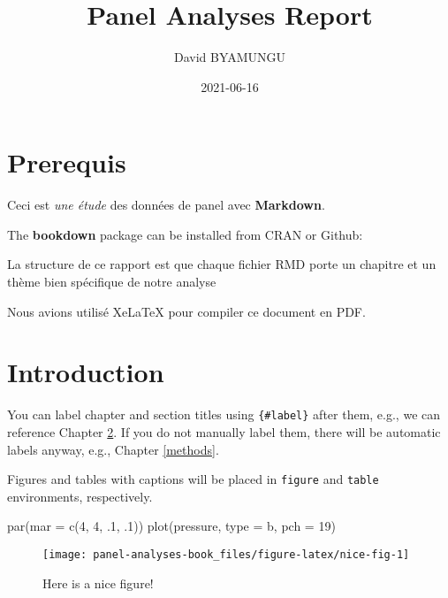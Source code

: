 \documentclass[
]{book}
\title{Panel Analyses Report}
\author{David BYAMUNGU}
\date{2021-06-16}
\newenvironment{Shaded}{\begin{snugshade}}{\end{snugshade}}
\newcommand{\AttributeTok}[1]{\textcolor[rgb]{0.77,0.63,0.00}{#1}}
\newcommand{\DecValTok}[1]{\textcolor[rgb]{0.00,0.00,0.81}{#1}}
\newcommand{\FunctionTok}[1]{\textcolor[rgb]{0.00,0.00,0.00}{#1}}
\newcommand{\NormalTok}[1]{#1}
\newcommand{\StringTok}[1]{\textcolor[rgb]{0.31,0.60,0.02}{#1}}
\begin{document}
\maketitle

{
\setcounter{tocdepth}{1}
\tableofcontents
}
\hypertarget{prerequis}{%
\chapter{Prerequis}\label{prerequis}}

Ceci est \emph{une étude} des données de panel avec \textbf{Markdown}.

The \textbf{bookdown} package can be installed from CRAN or Github:

La structure de ce rapport est que chaque fichier RMD porte un chapitre et un thème bien spécifique de notre analyse

Nous avions utilisé XeLaTeX pour compiler ce document en PDF.

\hypertarget{intro}{%
\chapter{Introduction}\label{intro}}

You can label chapter and section titles using \texttt{\{\#label\}} after them, e.g., we can reference Chapter \ref{intro}. If you do not manually label them, there will be automatic labels anyway, e.g., Chapter \ref{methods}.

Figures and tables with captions will be placed in \texttt{figure} and \texttt{table} environments, respectively.

\begin{Shaded}
\begin{Highlighting}[]
\FunctionTok{par}\NormalTok{(}\AttributeTok{mar =} \FunctionTok{c}\NormalTok{(}\DecValTok{4}\NormalTok{, }\DecValTok{4}\NormalTok{, .}\DecValTok{1}\NormalTok{, .}\DecValTok{1}\NormalTok{))}
\FunctionTok{plot}\NormalTok{(pressure, }\AttributeTok{type =} \StringTok{\textquotesingle{}b\textquotesingle{}}\NormalTok{, }\AttributeTok{pch =} \DecValTok{19}\NormalTok{)}
\end{Highlighting}
\end{Shaded}

\begin{figure}

{\centering \texttt{[image: panel-analyses-book\_files/figure-latex/nice-fig-1]} 

}

\caption{Here is a nice figure!}\label{fig:nice-fig}
\end{figure}
\end{document}
